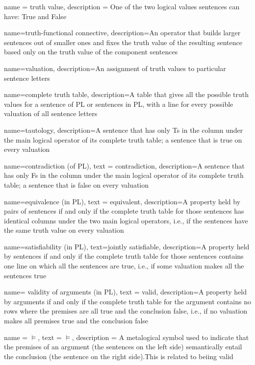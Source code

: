                  {
                   name = truth value,
                   description = {One of the two logical values sentences can have: True and False}
                   }

{
name=truth-functional connective,
description={An operator that builds larger sentences out of smaller ones and fixes the \gls{truth value} of the resulting sentence based only on the truth value of the component sentences}
}

{
name=valuation,
description={An assignment of \glspl{truth value} to particular \glspl{sentence letter}}
}

{
name=complete truth table,
description={A table that gives all the possible \glspl{truth value} for a \gls{sentence of PL} or sentences in PL, with a line for every possible \gls{valuation} of all sentence letters}
}

{
name=tautology,
description={A sentence that has only Ts in the column under the main logical operator of its \gls{complete truth table}; a sentence that is true on every \gls{valuation}}
}

{
  name=contradiction (of PL),
  text = contradiction,
description={A sentence that has only Fs in the column under the main logical operator of its \gls{complete truth table}; a sentence that is false on every \gls{valuation}}
}

{
  name=equivalence (in PL),
  text = equivalent,
description={A property held by pairs of sentences if and only if the \gls{complete truth table} for those sentences has identical columns under the two main logical operators, i.e., if the sentences have the same truth value on every valuation}
}

{
  name=satisfiability (in PL),
  text=jointly satisfiable,
description={A property held by sentences if and only if the \gls{complete truth table} for those sentences contains one line on which all the sentences are true, i.e., if some \gls{valuation} makes all the sentences true}
}

{
  name= validity of arguments (in PL),
  text = valid,
description={A property held by arguments if and only if the \gls{complete truth table} for the argument contains no rows where the \glspl{premise} are all true and the \gls{conclusion} false, i.e., if no \gls{valuation} makes all premises true and the conclusion false}
}

{
name = {\ensuremath{\vDash}},
text = $\vDash$,
description = {A metalogical symbol used to indicate that the premises of an argument (the sentences on the left side) semantically entail the conclusion (the sentence on the right side).This is related to beiing \gls{valid}}
} 
